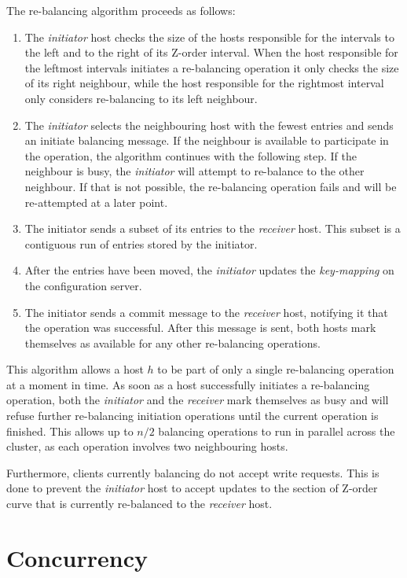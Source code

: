\documentclass[11pt,a4paper]{globis-book}
\begin{document}
The re-balancing algorithm proceeds as follows: 
\begin{enumerate}
    \item The \textit{initiator} host checks the size of the hosts responsible for the intervals to the left and to the right of its Z-order interval. When the host responsible for the leftmost intervals initiates a re-balancing operation it only checks the size of its right neighbour, while the host responsible for the rightmost interval only considers re-balancing to its left neighbour.
    \item The \textit{initiator} selects the neighbouring host with the fewest entries and sends an initiate balancing message. If the neighbour is available to participate in the operation, the algorithm continues with the following step. If the neighbour is busy, the \textit{initiator} will attempt to re-balance to the other neighbour. If that is not possible, the re-balancing operation fails and will be re-attempted at a later point.
    \item The initiator sends a subset of its entries to the \textit{receiver} host. This subset is a contiguous run of entries stored by the initiator.
    \item After the entries have been moved, the \textit{initiator} updates the \textit{key-mapping} on the configuration server. 
    \item The initiator sends a commit message to the \textit{receiver} host, notifying it that the operation was successful. After this message is sent, both hosts mark themselves as available for any other re-balancing operations.
\end{enumerate}

This algorithm allows a host $h$ to be part of only a single re-balancing operation at a moment in time. As soon as a host successfully initiates a re-balancing operation, both the \textit{initiator} and the \textit{receiver} mark themselves as busy and will refuse further re-balancing initiation operations until the current operation is finished. This allows up to $n/2$ balancing operations to run in parallel across the cluster, as each operation involves two neighbouring hosts.

Furthermore, clients currently balancing do not accept write requests. This is done to prevent the \textit{initiator} host to accept updates to the section of Z-order curve that is currently re-balanced to the \textit{receiver} host.

\chapter{Concurrency}
\label{ch:concurrency}
\end{document}

